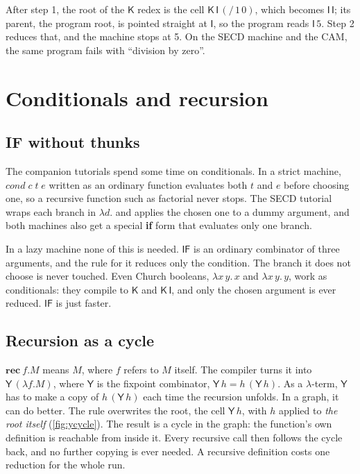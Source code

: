 \documentclass[11pt,a4paper]{article}
\newcommand{\cmb}[1]{\textsf{#1}}
\newcommand{\I}{\cmb{I}}
\newcommand{\K}{\cmb{K}}
\newcommand{\Y}{\cmb{Y}}
\newcommand{\IF}{\cmb{IF}}
\theoremstyle{definition}
\theoremstyle{plain}
\begin{document}
\noindent
After step 1, the root of the $\K$ redex is the cell $\K\,\I\,({/}\,1\,0)$,
which becomes $\I\,\I$; its parent, the program root, is pointed straight at
$\I$, so the program reads $\I\,5$. Step 2 reduces that, and the machine
stops at 5. On the SECD machine and the CAM, the same program fails with
``division by zero''.

\section{Conditionals and recursion}\label{sec:recursion}

\subsection{IF without thunks}

The companion tutorials spend some time on conditionals. In a strict machine,
$\mathit{cond}\;c\;t\;e$ written as an ordinary function evaluates both $t$
and $e$ before choosing one, so a recursive function such as factorial never
stops. The SECD tutorial wraps each branch in $\lambda d.$ and applies the
chosen one to a dummy argument, and both machines also get a special
\textbf{if} form that evaluates only one branch.

In a lazy machine none of this is needed. $\IF$ is an ordinary combinator of
three arguments, and the rule for it reduces only the condition. The branch
it does not choose is never touched. Even Church booleans,
$\lambda x\,y.\,x$ and $\lambda x\,y.\,y$, work as conditionals: they compile
to $\K$ and $\K\,\I$, and only the chosen argument is ever reduced. $\IF$ is
just faster.

\subsection{Recursion as a cycle}

$\mathbf{rec}\ f.M$ means $M$, where $f$ refers to $M$ itself. The compiler
turns it into $\Y\,(\lambda f.M)$, where $\Y$ is the fixpoint combinator,
$\Y\,h = h\,(\Y\,h)$. As a $\lambda$-term, $\Y$ has to make a copy of
$h\,(\Y\,h)$ each time the recursion unfolds. In a graph, it can do better.
The rule overwrites the root, the cell $\Y\,h$, with $h$ applied to
\emph{the root itself} (\cref{fig:ycycle}). The result is a cycle in the
graph: the function's own definition is reachable from inside it. Every
recursive call then follows the cycle back, and no further copying is ever
needed. A recursive definition costs one reduction for the whole run.
\end{document}
